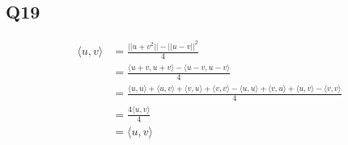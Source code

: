 \documentclass{article}
\begin{document}
\subsection*{Q19}
\begin{align*}
	\langle u, v \rangle &= \frac{||u+v^2|| - ||u-v||^2}{4}\\
	&= \frac{\langle u+v, u+v \rangle - \langle u-v, u-v \rangle}{4}\\
	&= \frac{\langle u, u \rangle + \langle u , v \rangle + \langle v, u \rangle + \langle v, v \rangle - \langle u, u \rangle + \langle v, u \rangle + \langle u, v \rangle - \langle v, v \rangle}{4}\\
	&= \frac{4\langle u , v \rangle}{4}\\\
	&= \langle u, v \rangle
\end{align*}
\end{document}
